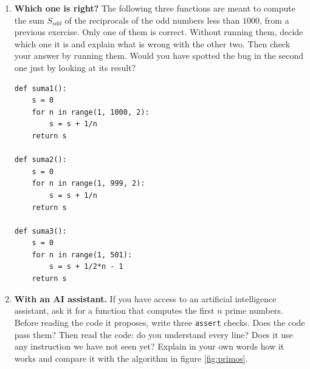 \begin{enumerate}
\item \textbf{Which one is right?} The following three functions are meant to compute the sum $S_{odd}$ of the reciprocals of the odd numbers less than $1000$, from a previous exercise. Only one of them is correct. Without running them, decide which one it is and explain what is wrong with the other two. Then check your answer by running them. Would you have spotted the bug in the second one just by looking at its result?
\begin{verbatim}
def suma1():
    s = 0
    for n in range(1, 1000, 2):
        s = s + 1/n
    return s

def suma2():
    s = 0
    for n in range(1, 999, 2):
        s = s + 1/n
    return s

def suma3():
    s = 0
    for n in range(1, 501):
        s = s + 1/2*n - 1
    return s
\end{verbatim}

\item \textbf{With an AI assistant.} If you have access to an artificial intelligence assistant, ask it for a function that computes the first $n$ prime numbers. Before reading the code it proposes, write three \texttt{assert} checks. Does the code pass them? Then read the code: do you understand every line? Does it use any instruction we have not seen yet? Explain in your own words how it works and compare it with the algorithm in figure \ref{fig:primos}.
\end{enumerate}
